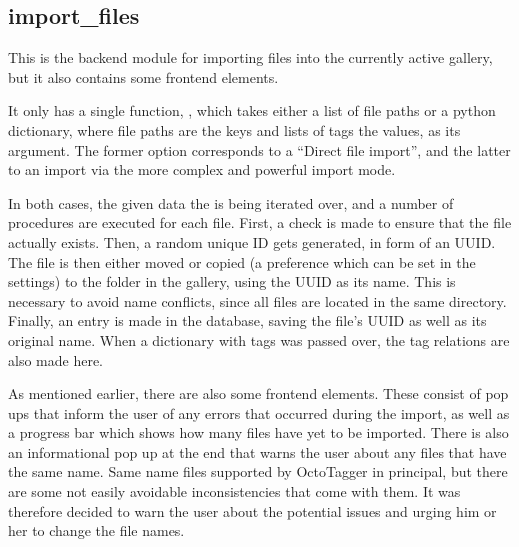\subsection{import\_files}

This is the backend module for importing files into the currently active
gallery, but it also contains some frontend elements.

It only has a single function, , which takes either a
list of file paths or a python dictionary, where file paths are the keys and
lists of tags the values, as its argument. The former option corresponds to a
``Direct file import'', and the latter to an import via the more complex and
powerful import mode.

In both cases, the given data the is being iterated over, and a number of
procedures are executed for each file. First, a check is made to ensure that
the file actually exists. Then, a random unique ID gets generated, in form of
an UUID. The file is then either moved or copied (a preference
which can be set in the settings) to the  folder in the gallery,
using the UUID as its name. This is necessary to avoid name
conflicts, since all files are located in the same directory. Finally, an entry
is made in the database, saving the file's UUID as well as its
original name. When a dictionary with tags was passed over, the tag relations
are also made here.

As mentioned earlier, there are also some frontend elements. These consist of
pop ups that inform the user of any errors that occurred during the import, as
well as a progress bar which shows how many files have yet to be imported.
There is also an informational pop up at the end that warns the user about any
files that have the same name. Same name files supported by OctoTagger in
principal, but there are some not easily avoidable inconsistencies that come
with them. It was therefore decided to warn the user about the potential issues
and urging him or her to change the file names.
